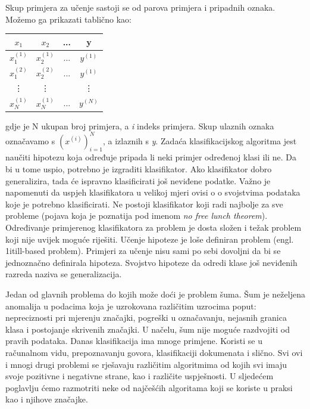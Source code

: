 \documentclass[times, utf8, zavrsni]{fer}
\begin{document}
Skup primjera za učenje sastoji se od parova primjera i pripadnih oznaka. Možemo ga prikazati tablično kao:

\begin{center}
 \begin{tabular}{||c c c c||} 
 \hline
 $x_1$ & $x_2$ & ... & y  \\ [0.5ex] 
 \hline\hline
 $x_1^{(1)}$ & $x_2^{(1)}$ & ... & $y^{(1)}$ \\ 
 \hline
 $x_1^{(2)}$ & $x_2^{(2)}$ & ... & $y^{(1)}$ \\
 \hline
 \vdots & \vdots &  & \vdots \\
 \hline
 $x_N^{(1)}$ & $x_N^{(1)}$ & ... & $y^{(N)}$ \\ [1ex] 
 \hline
\end{tabular}
\end{center} 


gdje je N ukupan broj primjera, a \textit{i} indeks primjera. Skup ulaznih oznaka označavamo s $(x^{(i)})_{i=1}^N$, a izlaznih s \textit{y}. Zadaća klasifikacijskog algoritma jest naučiti hipotezu koja određuje pripada li neki primjer određenoj klasi ili ne. Da bi u tome uspio, potrebno je izgraditi klasifikator. Ako klasifikator dobro generalizira, tada će ispravno klasificirati još neviđene podatke. Važno je napomenuti da uspjeh klasifikatora u velikoj mjeri ovisi o o svojstvima podataka koje je potrebno klasificirati. Ne postoji klasifikator koji radi najbolje za sve probleme (pojava koja je poznatija pod imenom \textit{no free lunch theorem}). Određivanje primjerenog klasifikatora za problem je dosta složen i težak problem koji nije uvijek moguće riješiti. Učenje hipoteze je loše definiran problem (engl. \text1it{ill-based problem}). Primjeri za učenje nisu sami po sebi dovoljni da bi se jednoznačno definirala hipoteza. Svojstvo hipoteze da odredi klase još neviđenih razreda naziva se generalizacija. 

Jedan od glavnih problema do kojih može doći je problem šuma. Šum je neželjena anomalija u podacima koja je uzrokovana različitim uzrocima poput: nepreciznosti pri mjerenju značajki, pogreški u označavanju, nejasnih granica klasa i postojanje skrivenih značajki. U načelu, šum nije moguće razdvojiti od pravih podataka. Danas klasifikacija ima mnoge primjene. Koristi se u računalnom vidu, prepoznavanju govora, klasifikaciji dokumenata i slično. Svi ovi i mnogi drugi problemi se rješavaju različitim algoritmima od kojih svi imaju svoje pozitivne i negativne strane, kao i različite uspješnosti. U sljedećem poglavlju ćemo razmotriti neke od najčešćih algoritama koji se koriste u praksi kao i njihove značajke. 
\end{document}
